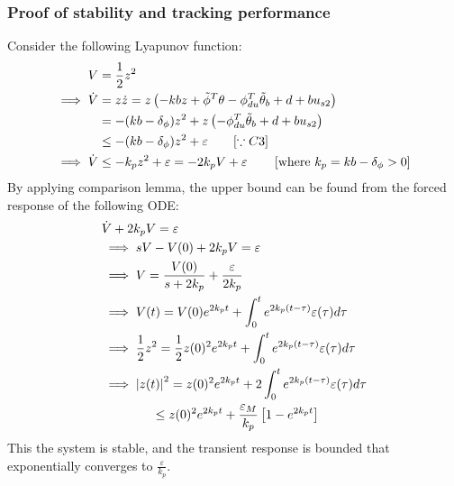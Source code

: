 \subsubsection{Proof of stability and tracking performance}
Consider the following Lyapunov function:
\begin{align*}
    V &= \frac{1}{2} z^2\\
    \implies \dot V &= z \dot z = z \left( -kbz + \tilde \phi^T \theta - \phi_{du}^T \tilde \theta_b + d + b u_{s2} \right)\\
    &= -(kb - \delta_{\phi})z^2 + z \left( - \phi_{du}^T \tilde \theta_b + d + b u_{s2} \right)\\
    &\leq -(kb - \delta_{\phi}) z^2 + \varepsilon \qquad [\because C3] \\
    \implies \dot V &\leq -k_p z^2 + \varepsilon = - 2 k_p V + \varepsilon \qquad \left[ \text{where } k_p = kb - \delta_{\phi} > 0 \right]
\end{align*}
By applying comparison lemma, the upper bound can be found from the forced
response of the following ODE:
\begin{align*}
    &\dot V + 2 k_p V = \varepsilon\\
    &\implies sV - V(0) + 2 k_p V = \varepsilon\\
    &\implies V = \frac{V(0)}{s + 2 k_p} + \frac{\varepsilon}{2 k_p}\\
    &\implies V(t) = V(0)e^{2 k_p t} + \int_0^t{e^{2 k_p (t-\tau)} \varepsilon(\tau) d\tau}\\
    &\implies \frac{1}{2} z^2 = \frac{1}{2} z(0)^2 e^{2 k_p t} + \int_0^t{e^{2 k_p (t-\tau)} \varepsilon(\tau) d\tau}\\
    &\implies \left\lvert z(t) \right\rvert^2 = z(0)^2 e^{2 k_p t} +2 \int_0^t{e^{2 k_p (t-\tau)} \varepsilon(\tau) d\tau}\\
    &\qquad \qquad \leq z(0)^2 e^{2 k_p t} + \frac{\varepsilon_M}{k_p} \left[1 -  e^{2 k_p t} \right]
\end{align*}
This the system is stable, and the transient response is bounded that
exponentially converges to $\frac{\varepsilon}{k_p}$.
